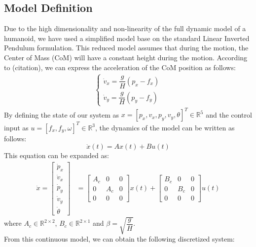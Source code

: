 \subsection{Model Definition}
Due to the high dimensionality and non-linearity of the full dynamic model of a humanoid, we have used a simplified model base on the standard Linear Inverted Pendulum formulation.
This reduced model assumes that during the motion, the Center of Mass (CoM) will have a constant height during the motion.
According to (citation), we can express the acceleration of the CoM position as follows:
\begin{align}
    \begin{cases}
        \dot{v}_{x} = \dfrac{g}{H}(p_{x} - f_{x})
        \\[1ex]
        \dot{v}_{y} = \dfrac{g}{H}(p_{y} - f_{y})
    \end{cases}
\end{align}
By defining the state of our system as $x = [p_{x}, v_{x}, p_{y}, v_{y}, \theta]^T \in \mathbb{R}^5$ and the control input as $u = [f_{x}, f_{y}, \omega]^T \in \mathbb{R}^3$, the dynamics of the model can be written as follows:
\begin{equation}
    \dot{x}(t) = A x(t) + B u(t)
\end{equation}
This equation can be expanded as:
\begin{align}
    \dot{x} = 
    \begin{bmatrix}
        \dot{p}_{x}\\
        \dot{v}_{x}\\
        \dot{p}_{y}\\
        \dot{v}_{y}\\
        \dot{\theta}
    \end{bmatrix}
    &= 
    \begin{bmatrix}
        A_c & 0 & 0 \\
        0 & A_c & 0 \\
        0 & 0 & 0
    \end{bmatrix}
    x(t) +
    \begin{bmatrix}
        B_c & 0 & 0 \\
        0 & B_c & 0 \\
        0 & 0 & 0
    \end{bmatrix}
    u(t)
\end{align}
where $A_{c} \in \mathbb{R}^{2 \times 2}$, $B_{c} \in \mathbb{R}^{2 \times 1}$ and $\beta = \sqrt{\dfrac{g}{H}}$.
\\
From this continuous model, we can obtain the following discretized system: 
